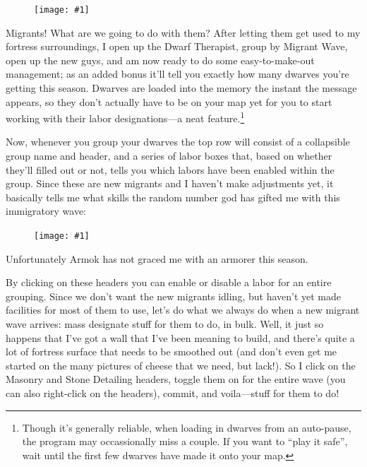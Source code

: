 \documentclass[]{article}
\newcommand{\fullfigure}[1] {
\begin{figure}[h!]
\texttt{[image: \#1]}
\end{figure}
}
\newcommand{\fullfigurecaption}[1] {
\begin{center}
\vspace{-12pt}
#1
\end{center}
}
\begin{document}
\fullfigure{Sec2Fig8}

Migrants! What are we going to do with them? After letting them get used to my fortress surroundings, I
open up the Dwarf Therapist, group by Migrant Wave, open up the new guys, and am now ready to do some
easy-to-make-out management; as an added bonus it'll tell you exactly how many dwarves you're getting
this season. Dwarves are loaded into the memory the instant the message appears, so they
don't actually have to be on your map yet for you to start working with their labor designations---a
neat feature.\footnote{Though it's generally reliable, when loading in dwarves from an auto-pause, the
program may occassionally miss a couple. If you want to ``play it safe'', wait until the first few
dwarves have made it onto your map.}

Now, whenever you group your dwarves the top row will consist of a collapsible group name and header, and
a series of labor boxes that, based on whether they'll filled out or not, tells you which labors have
been enabled within the group. Since these are new migrants and I haven't make adjustments yet, it
basically tells me what skills the random number god has gifted me with this immigratory wave:

\fullfigure{Sec2Fig9}
\fullfigurecaption{Unfortunately Armok has not graced me with an armorer this season.}

By clicking on these headers you can enable or disable a labor for an entire grouping. Since we don't
want the new migrants idling, but haven't yet made facilities for most of them to use, let's do what we
always do when a new migrant wave arrives: mass designate stuff for them to do, in bulk. Well, it just so
happens that I've got a wall that I've been meaning to build, and there's quite a lot of fortress surface
that needs to be smoothed out (and don't even get me started on the many pictures of cheese that we need,
but lack!). So I click on the Masonry and Stone Detailing headers, toggle them on for the entire wave
(you can also right-click on the headers), commit, and voila---stuff for them to do!
\end{document}
